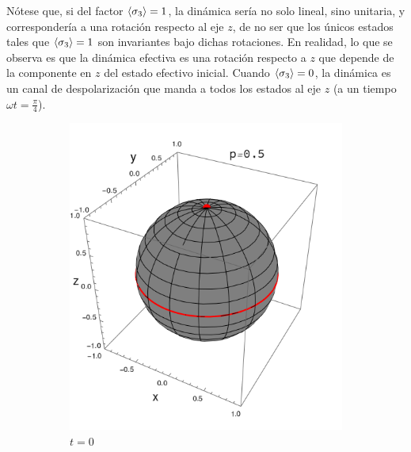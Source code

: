 Nótese que, si del factor $\expval{\sigma_{3}}=1$, la dinámica sería no solo lineal, sino unitaria, y correspondería a una rotación respecto al eje $z$, de no ser que los únicos estados tales que $\expval{\sigma_{3}}=1$ son invariantes bajo dichas rotaciones. En realidad, lo que se observa es que la dinámica efectiva es una rotación respecto a $z$ que depende de la componente en $z$ del estado efectivo inicial. Cuando $\expval{\sigma_{3}}=0$, la dinámica es un canal de despolarización que manda a todos los estados al eje $z$ (a un tiempo $\omega t =\frac{\pi}{4}$). 

\begin{figure}[ht!]
    \centering
    \begin{subfigure}{0.32\textwidth}
      \centering
      \includegraphics[width=0.9\linewidth]{chapter3/figures_special/sphere_Ising_t=0._z=0.9_p=0.5.png}
      \caption{$t=0$}
    \end{subfigure}%
    \begin{subfigure}{0.32\textwidth}
      \centering

\end{subfigure}
\end{figure}
